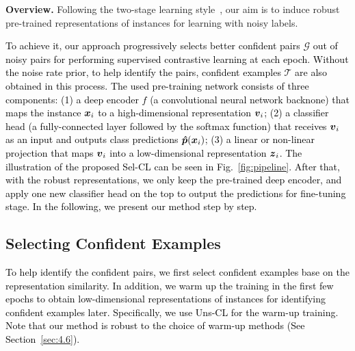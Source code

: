 \documentclass[10pt,twocolumn,letterpaper]{article}
\newcommand{\myPara}[1]{\vspace{.05in}\noindent\textbf{#1}}
\newcommand{\bm}[1]{\mbox{\boldmath{$#1$}}}
\begin{document}
\myPara{Overview.} Following the two-stage learning style~\cite{Ortego2021,Li2021ICLR,Ghosh2021,Zheltonozhskii2021}, our aim is to induce robust pre-trained representations of instances for learning with noisy labels.

\textcolor{black}{To achieve it, our approach progressively selects better confident pairs $\mathcal{G}$ out of noisy pairs for performing supervised contrastive learning at each epoch. Without the noise rate prior, to help identify the pairs, confident examples $\mathcal{T}$ are also obtained in this process. The used pre-training network consists of three components: (1) a deep encoder $f$ (a convolutional neural network backnone) that maps the instance $\bm{x}_i$ to a high-dimensional representation $\bm{v}_i$; (2) a classifier head (a fully-connected layer followed by the softmax function) that receives $\bm{v}_i$ as an input and outputs class predictions $\bm{\hat{p}}(\bm{x}_i)$; (3) a linear or non-linear projection that maps  $\bm{v}_i$ into a low-dimensional representation $\bm{z}_i$.  The illustration of the proposed Sel-CL can be seen in Fig.~\ref{fig:pipeline}.
After that, with the robust representations, we only keep the pre-trained deep encoder, and apply one new classifier head on the top to output the predictions for fine-tuning stage. In the following, we present our method step by step.}

\vspace{-3pt}
\subsection{Selecting Confident Examples}
\textcolor{black}{To help identify the confident pairs, we first select confident examples base on the representation similarity.
In addition, we warm up the training in the first few epochs to obtain  low-dimensional representations of instances for identifying confident examples later. Specifically, we use Uns-CL \cite{chen2020simple} for the warm-up training. Note that our method is robust to the choice of warm-up methods (See Section~\ref{sec:4.6}).} 
\end{document}
